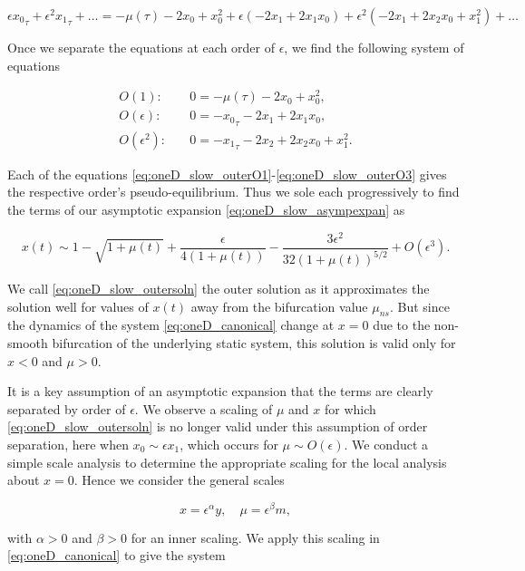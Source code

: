 \begin{equation*}
\epsilon {x_0}_\tau +\epsilon^2 {x_1}_\tau+\ldots= -\mu(\tau) -2x_0+x_0^2+\epsilon(-2x_1+2x_1x_0)+\epsilon^2(-2x_1+2x_2x_0+x_1^2)+\ldots
\end{equation*}

Once we separate the equations at each order of $\epsilon$, we find the following system of equations

\begin{align}
\label{eq:oneD_slow_outerO1}
O(1):& \quad 0=-\mu(\tau)-2x_0+x_0^2,\\
\label{eq:oneD_slow_outerO2}
O(\epsilon):& \quad 0=-{x_0}_\tau-2x_1+2x_1 x_0,\\
\label{eq:oneD_slow_outerO3}
O(\epsilon^2):& \quad 0=-{x_1}_\tau-2x_2+2x_2x_0+x_1^2.
\end{align}

Each of the equations \eqref{eq:oneD_slow_outerO1}-\eqref{eq:oneD_slow_outerO3} gives the respective order's pseudo-equilibrium. Thus we sole each progressively to find the terms of our asymptotic expansion \eqref{eq:oneD_slow_asympexpan} as

\begin{equation}\label{eq:oneD_slow_outersoln}
x(t)\sim 1-\sqrt{1+\mu(t)}+ \frac{\epsilon}{4(1+\mu(t))}-\frac{3\epsilon^2}{32(1+\mu(t))^{5/2}}+O(\epsilon^3).
\end{equation}

We call \eqref{eq:oneD_slow_outersoln} the outer solution as it approximates the solution well for values of $x(t)$ away from the bifurcation value $\mu_{ns}$. But since the dynamics of the system \eqref{eq:oneD_canonical} change at $x=0$ due to the non-smooth bifurcation of the underlying static system, this solution is valid only for $x<0$ and $\mu>0$.


It is a key assumption of an asymptotic expansion that the terms are clearly separated by order of $\epsilon$. We observe a scaling of $\mu$ and $x$ for which \eqref{eq:oneD_slow_outersoln} is no longer valid under this assumption of order separation, here when $x_0\sim \epsilon x_1$, which occurs for $\mu\sim O(\epsilon)$. We conduct a simple scale analysis to determine the appropriate scaling for the local analysis about $x=0$. Hence we consider the general scales

\begin{equation*}
x=\epsilon^\alpha y,\quad \mu = \epsilon^\beta m,
\end{equation*}

with $\alpha>0$ and $\beta>0$ for an inner scaling. We apply this scaling in \eqref{eq:oneD_canonical} to give the system

